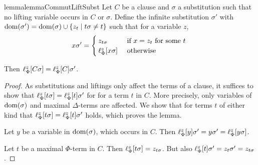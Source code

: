 \begin{restatable}{lemma}{lemmaCommutLiftSubst}
	\label{lemma:lif}
	Let $C$ be a clause and $\sigma$ a substitution such that no lifting variable occurs in $C$ or $\sigma$.
	Define the infinite substitution $\sigma'$ with $\operatorname{dom}(\sigma') = \operatorname{dom}(\sigma) \cup \{ z_t \mid t\sigma \neq t \}$ such that for a variable $z$, 
	\[
		x \sigma' =
		\begin{cases} 
			z_{t\sigma} & \text{ if } x = z_t \text{ for some $t$ }\\%
			\lifphi{x\sigma} & \text{ otherwise}
		\end{cases} 
	\]

	Then
	$\ell_{\Phi}^{z}[C\sigma] =
	\ell_{\Phi}^{z}[C]\sigma'$.
\end{restatable}
\begin{proof}
	As substitutions and liftings only affect the terms of a clause, it suffices to  show that 
	$\ell_{\Phi}^{z}[t\sigma] = \ell_{\Phi}^{z}[t]\sigma'$ for for a term $t$ in $C$.
	More precisely, only variables of $\operatorname{dom}(\sigma)$ and maximal $\Delta$-terms are affected. 
	We show that for terms $t$ of either kind that
	$ \ell_{\Phi}^{z}[ t \sigma ] = \ell_{\Phi}^{z}[ t ] \sigma'$ holds, which proves the lemma.

	Let $y$ be a variable in $\operatorname{dom}(\sigma)$, which occurs in $C$. Then $\ell_{\Phi}^{z}[y]\sigma' = y\sigma' = \ell_{\Phi}^{z}[y\sigma]$.

	Let $t$ be a maximal $\Phi$-term in $C$.
	Then $\ell_{\Phi}^{z}[ t\sigma] = z_{t\sigma}$.
	But also $\ell_{\Phi}^{z}[t]\sigma' = z_t\sigma' = z_{t\sigma}$.
\end{proof}




